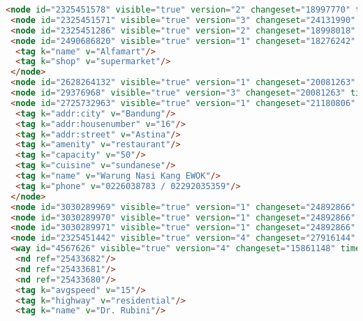 \begin{lstlisting}[language=HTML,basicstyle=\tiny,caption=bandung1.xml]
 <node id="2325451578" visible="true" version="2" changeset="18997770" timestamp="2013-11-19T17:08:36Z" user="ubanovic" uid="1784103" lat="-6.9048417" lon="107.6021410"/>
 <node id="2325451571" visible="true" version="3" changeset="24131990" timestamp="2014-07-14T03:03:32Z" user="brambanan" uid="2092576" lat="-6.9048702" lon="107.6013524"/>
 <node id="2325451286" visible="true" version="2" changeset="18998018" timestamp="2013-11-19T17:23:34Z" user="ubanovic" uid="1784103" lat="-6.9012529" lon="107.5974289"/>
 <node id="2490686820" visible="true" version="1" changeset="18276242" timestamp="2013-10-10T07:28:52Z" user="ArjanO" uid="38066" lat="-6.9071703" lon="107.5996685">
  <tag k="name" v="Alfamart"/>
  <tag k="shop" v="supermarket"/>
 </node>
 <node id="2628264132" visible="true" version="1" changeset="20081263" timestamp="2014-01-19T09:38:29Z" user="Irfan Muhammad" uid="646006" lat="-6.9116314" lon="107.5979581"/>
 <node id="29376968" visible="true" version="3" changeset="20081263" timestamp="2014-01-19T09:38:32Z" user="Irfan Muhammad" uid="646006" lat="-6.9117870" lon="107.5979651"/>
 <node id="2725732963" visible="true" version="1" changeset="21180806" timestamp="2014-03-18T19:57:06Z" user="Warung Nasi Kang EWOK" uid="1991592" lat="-6.9052749" lon="107.5961955">
  <tag k="addr:city" v="Bandung"/>
  <tag k="addr:housenumber" v="16"/>
  <tag k="addr:street" v="Astina"/>
  <tag k="amenity" v="restaurant"/>
  <tag k="capacity" v="50"/>
  <tag k="cuisine" v="sundanese"/>
  <tag k="name" v="Warung Nasi Kang EWOK"/>
  <tag k="phone" v="0226038783 / 02292035359"/>
 </node>
 <node id="3030289969" visible="true" version="1" changeset="24892866" timestamp="2014-08-20T18:40:31Z" user="albahrimaraxsa" uid="2162153" lat="-6.9069924" lon="107.5982831"/>
 <node id="3030289970" visible="true" version="1" changeset="24892866" timestamp="2014-08-20T18:40:31Z" user="albahrimaraxsa" uid="2162153" lat="-6.9067987" lon="107.5982587"/>
 <node id="3030289971" visible="true" version="1" changeset="24892866" timestamp="2014-08-20T18:40:31Z" user="albahrimaraxsa" uid="2162153" lat="-6.9066710" lon="107.5982569"/>
 <node id="2325451442" visible="true" version="4" changeset="27916144" timestamp="2015-01-04T18:06:33Z" user="isonpurba" uid="2552445" lat="-6.9045011" lon="107.6024922"/>
 <way id="4567626" visible="true" version="4" changeset="15861148" timestamp="2013-04-25T13:56:12Z" user="mrdoggie94" uid="1331966">
  <nd ref="25433682"/>
  <nd ref="25433681"/>
  <nd ref="25433680"/>
  <tag k="avgspeed" v="15"/>
  <tag k="highway" v="residential"/>
  <tag k="name" v="Dr. Rubini"/>

\end{lstlisting}
